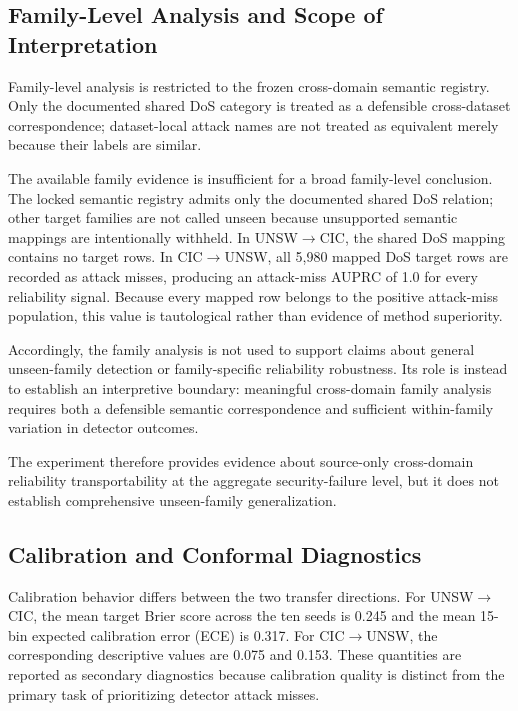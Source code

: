 \documentclass[conference]{IEEEtran}
\begin{document}
\subsection{Family-Level Analysis and Scope of Interpretation}

Family-level analysis is restricted to the frozen cross-domain semantic registry. Only the documented shared DoS category is treated as a defensible cross-dataset correspondence; dataset-local attack names are not treated as equivalent merely because their labels are similar.

The available family evidence is insufficient for a broad family-level conclusion. The locked semantic registry admits only the documented shared DoS relation; other target families are not called unseen because unsupported semantic mappings are intentionally withheld. In UNSW$\rightarrow$CIC, the shared DoS mapping contains no target rows. In CIC$\rightarrow$UNSW, all 5,980 mapped DoS target rows are recorded as attack misses, producing an attack-miss AUPRC of 1.0 for every reliability signal. Because every mapped row belongs to the positive attack-miss population, this value is tautological rather than evidence of method superiority.

Accordingly, the family analysis is not used to support claims about general unseen-family detection or family-specific reliability robustness. Its role is instead to establish an interpretive boundary: meaningful cross-domain family analysis requires both a defensible semantic correspondence and sufficient within-family variation in detector outcomes.

The experiment therefore provides evidence about source-only cross-domain reliability transportability at the aggregate security-failure level, but it does not establish comprehensive unseen-family generalization.

\subsection{Calibration and Conformal Diagnostics}

Calibration behavior differs between the two transfer directions. For UNSW$\rightarrow$CIC, the mean target Brier score across the ten seeds is 0.245 and the mean 15-bin expected calibration error (ECE) is 0.317. For CIC$\rightarrow$UNSW, the corresponding descriptive values are 0.075 and 0.153. These quantities are reported as secondary diagnostics because calibration quality is distinct from the primary task of prioritizing detector attack misses.
\end{document}
